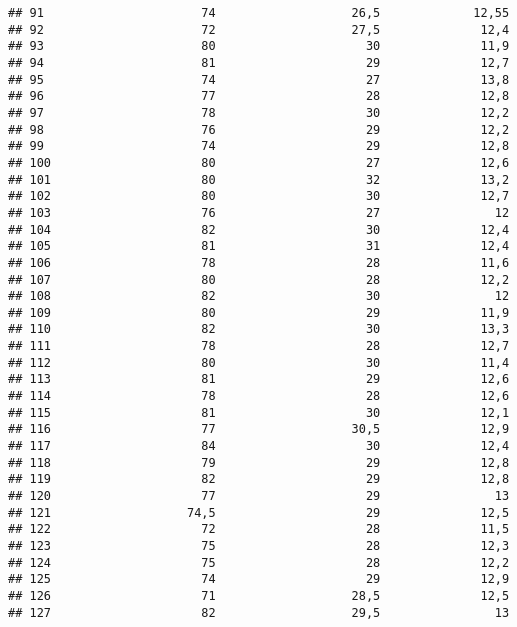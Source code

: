 \documentclass[
]{article}
\begin{document}
\begin{verbatim}
## 91                      74                   26,5             12,55
## 92                      72                   27,5              12,4
## 93                      80                     30              11,9
## 94                      81                     29              12,7
## 95                      74                     27              13,8
## 96                      77                     28              12,8
## 97                      78                     30              12,2
## 98                      76                     29              12,2
## 99                      74                     29              12,8
## 100                     80                     27              12,6
## 101                     80                     32              13,2
## 102                     80                     30              12,7
## 103                     76                     27                12
## 104                     82                     30              12,4
## 105                     81                     31              12,4
## 106                     78                     28              11,6
## 107                     80                     28              12,2
## 108                     82                     30                12
## 109                     80                     29              11,9
## 110                     82                     30              13,3
## 111                     78                     28              12,7
## 112                     80                     30              11,4
## 113                     81                     29              12,6
## 114                     78                     28              12,6
## 115                     81                     30              12,1
## 116                     77                   30,5              12,9
## 117                     84                     30              12,4
## 118                     79                     29              12,8
## 119                     82                     29              12,8
## 120                     77                     29                13
## 121                   74,5                     29              12,5
## 122                     72                     28              11,5
## 123                     75                     28              12,3
## 124                     75                     28              12,2
## 125                     74                     29              12,9
## 126                     71                   28,5              12,5
## 127                     82                   29,5                13

\end{verbatim}
\end{document}
